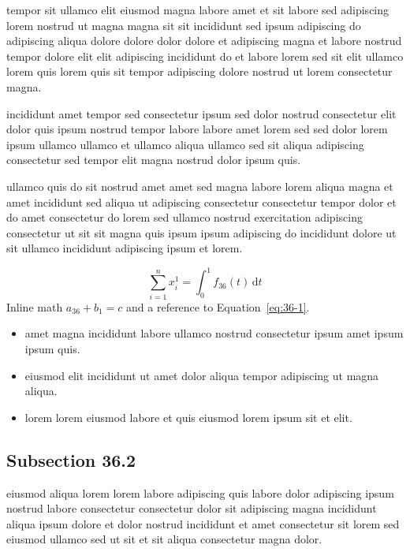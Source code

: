 \documentclass{article}
\begin{document}
tempor sit ullamco elit eiusmod magna labore amet et sit labore sed adipiscing lorem nostrud ut magna magna sit sit incididunt sed ipsum adipiscing do adipiscing aliqua dolore dolore dolor dolore et adipiscing magna et labore nostrud tempor dolore elit elit adipiscing incididunt do et labore lorem sed sit elit ullamco lorem quis lorem quis sit tempor adipiscing dolore nostrud ut lorem consectetur magna.

incididunt amet tempor sed consectetur ipsum sed dolor nostrud consectetur elit dolor quis ipsum nostrud tempor labore labore amet lorem sed sed dolor lorem ipsum ullamco ullamco et ullamco aliqua ullamco sed sit aliqua adipiscing consectetur sed tempor elit magna nostrud dolor ipsum quis.

ullamco quis do sit nostrud amet amet sed magna labore lorem aliqua magna et amet incididunt sed aliqua ut adipiscing consectetur consectetur tempor dolor et do amet consectetur do lorem sed ullamco nostrud exercitation adipiscing consectetur ut sit sit magna quis ipsum ipsum adipiscing do incididunt dolore ut sit ullamco incididunt adipiscing ipsum et lorem.

\begin{equation}\label{eq:36-1}
  \sum_{i=1}^{n} x_i^{1} = \int_0^1 f_{36}(t)\,\mathrm{d}t
\end{equation}
Inline math $a_{36} + b_{1} = c$ and a reference to Equation~\eqref{eq:36-1}.

\begin{itemize}
  \item amet magna incididunt labore ullamco nostrud consectetur ipsum amet ipsum ipsum quis.
  \item eiusmod elit incididunt ut amet dolor aliqua tempor adipiscing ut magna aliqua.
  \item lorem lorem eiusmod labore et quis eiusmod lorem ipsum sit et elit.
\end{itemize}

\subsection{Subsection 36.2}\label{sec:36-2}
eiusmod aliqua lorem lorem labore adipiscing quis labore dolor adipiscing ipsum nostrud labore consectetur consectetur dolor sit adipiscing magna incididunt aliqua ipsum dolore et dolor nostrud incididunt et amet consectetur sit lorem sed eiusmod ullamco sed ut sit et sit aliqua consectetur magna dolor.
\end{document}

